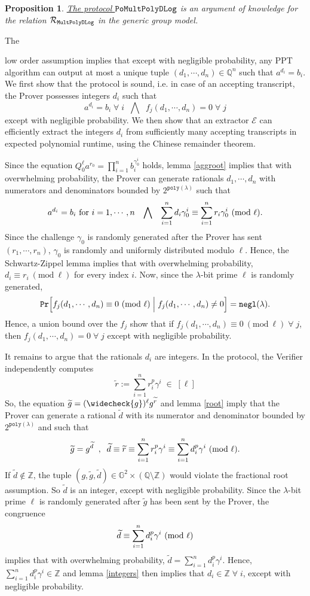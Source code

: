 \documentclass[11pt, lettersize, notitlepage, leqno, footskip=0.6cm]{article}
\newcommand{\bz}{\mathbb Z}
\newcommand{\bq}{\mathbb Q}
\newcommand{\slim}{\sum\limits}
\newcommand{\ttt}{\texttt}
\newcommand{\bG}{\mathbb{G}}
\newcommand{\negl}{\ttt{{negl}}}
\newcommand{\wti}{\widetilde}
\newcommand{\mc}{\mathcal}
\newcommand{\sm}{\setminus}
\newcommand{\lam}{\lambda}
\newcommand{\weck}{\widecheck}
\newcommand{\vs}{\vspace{-0.15cm}}
\newcommand{\op}{overwhelming probability}
\newcommand{\np}{negligible probability}
\newcommand{\Mod}[1]{\ (\mathrm{mod}\ #1)}
\newcommand{\E}{\mc{E}}
\newtheorem{Prop}[Thm]{Proposition}
\numberwithin{equation}{section}
\begin{document}
\vspace{0.2cm}


\begin{Prop}\hyperlink{Mult} {The protocol $\tt{PoMultPolyDLog}$} is an argument of knowledge for the relation $\mc{R}_{{\tt{MultPolyDLog}}}$ in the generic group model.\end{Prop}

\begin{prf} \hypertarget{Generalized}{The} low order assumption implies that except with \np, any PPT algorithm can output at most a unique tuple $(d_1,\cdots,d_n)\in\bq^n$ such that $a^{d_i} = b_i$. We first show that the protocol is sound, i.e. in case of an accepting transcript, the Prover possesses integers $d_i$ such that $$a^{d_i} = b_i\;\forall\; i\;\;\bigwedge\;\;f_j(d_1,\cdots,d_n) = 0\;\forall\; j $$ except with \np.  We then show that an extractor $\E$ can efficiently extract the integers $d_i$ from sufficiently many accepting transcripts in expected polynomial runtime, using the Chinese remainder theorem.

Since the equation $Q_0^{\ell} a^{r_0} = \prod_{i=1}^n b_i^{\gamma_{0}^i}$ holds, lemma \ref{aggroot} implies that with \op, the Prover can generate rationals $d_1,\cdots,d_n$ with numerators and denominators bounded by $2^{\ttt{poly}(\lam)}$ such that \vs $$a^{d_i} = b_i \text{ for } i=1,\cdots,n \;\;\;\bigwedge\;\;\; \sum\limits_{i=1}^n d_i\gamma_{0}^i\equiv \sum\limits_{i=1}^n r_i\gamma_{0}^i\Mod{\ell}. \vs $$ Since the challenge $\gamma_{0}$ is randomly generated after the Prover has sent $(r_1,\cdots,r_n)$, $\gamma_{0}$ is randomly and uniformly distributed modulo $\ell$. Hence, the Schwartz-Zippel lemma implies that with \op, $d_i\equiv r_i\Mod{\ell}$ for every index $i$. Now, since the $\lam$-bit prime $\ell$ is randomly generated, \vs $$\ttt{Pr}\Big[f_j(d_1,\cdots,d_n)\equiv 0\Mod{\ell} \;\Big|\; f_j(d_1,\cdots,d_n)\neq 0 \Big] = \negl(\lam) . \vs $$ Hence, a union bound over the $f_j$ show that if $f_j(d_1,\cdots,d_n)\equiv 0\Mod{\ell}\;\forall\;j$, then $f_j(d_1,\cdots,d_n) = 0 \;\forall\;j$ except with \np.

It remains to argue that the rationals $d_i$ are integers. In the protocol, the Verifier independently computes \vs $$\wti{r}:= \slim_{i=1}^n r_i^{p}\gamma^i\;\in\; [\ell]$$ So, the equation $\wti{g} = (\weck{g})^{\ell}g^{\wti{r}} $ and lemma \ref{root} imply that the Prover can generate a rational $\wti{d}$ with its numerator and denominator bounded by $2^{\ttt{poly}(\lam)}$ and such that \vs $$\wti{g} = g^{\wti{d}}\;\;,\;\;\wti{d}\equiv \wti{r}\equiv \slim_{i=1}^n r_i^p\gamma^i\equiv \slim_{i=1}^n d_i^p\gamma^i\Mod{\ell}. \vs $$ If $\wti{d}\notin\bz$, the tuple $(g, \wti{g}, \wti{d})\in \bG^2\times (\bq\sm \bz)$ would violate the fractional root assumption. So $\wti{d}$ is an integer, except with negligible probability. Since the $\lam$-bit prime $\ell$ is randomly generated after $\wti{g}$ has been sent by the Prover, the congruence \vs $$\wti{d}\equiv \slim_{i=1}^n d_i^p\gamma^i\Mod{\ell} \vs $$ implies that with \op, $\wti{d} = \slim_{i=1}^n d_i^p\gamma^i.$ Hence, $\slim_{i=1}^n d_i^p\gamma^i\in \bz$ and lemma \ref{integers} then implies that $ d_i\in \bz\;\forall\;i$, except with negligible probability. 


\end{prf}
\end{document}
